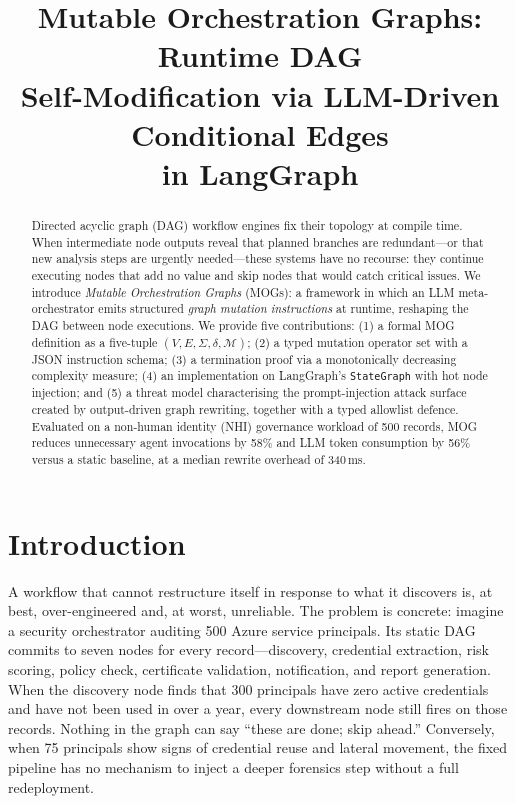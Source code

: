 \documentclass[conference]{IEEEtran}
\title{Mutable Orchestration Graphs: Runtime DAG\\
Self-Modification via LLM-Driven Conditional Edges\\
in LangGraph}
\author{
  \IEEEauthorblockN{Anonymous Author(s)}
  \IEEEauthorblockA{Submitted for blind review \\
  \texttt{anonymous@institution.edu}}
}
\begin{document}
\maketitle

\begin{abstract}
  Directed acyclic graph (DAG) workflow engines fix their topology
  at compile time. When intermediate node outputs reveal that planned
  branches are redundant---or that new analysis steps are urgently
  needed---these systems have no recourse: they continue executing
  nodes that add no value and skip nodes that would catch critical
  issues. We introduce \emph{Mutable Orchestration Graphs} (MOGs):
  a framework in which an LLM meta-orchestrator emits structured
  \emph{graph mutation instructions} at runtime, reshaping the DAG
  between node executions. We provide five contributions: (1) a
  formal MOG definition as a five-tuple $(V,E,\Sigma,\delta,\mathcal{M})$;
  (2) a typed mutation operator set with a JSON instruction schema;
  (3) a termination proof via a monotonically decreasing complexity
  measure; (4) an implementation on LangGraph's \texttt{StateGraph}
  with hot node injection; and (5) a threat model characterising
  the prompt-injection attack surface created by output-driven
  graph rewriting, together with a typed allowlist defence.
  Evaluated on a non-human identity (NHI) governance workload
  of 500 records, MOG reduces unnecessary agent invocations by
  58\% and LLM token consumption by 56\% versus a static baseline,
  at a median rewrite overhead of 340\,ms.
\end{abstract}

\section{Introduction}

A workflow that cannot restructure itself in response to what it
discovers is, at best, over-engineered and, at worst, unreliable.
The problem is concrete: imagine a security orchestrator auditing
500 Azure service principals. Its static DAG commits to seven nodes
for every record---discovery, credential extraction, risk scoring,
policy check, certificate validation, notification, and report
generation. When the discovery node finds that 300 principals have
zero active credentials and have not been used in over a year, every
downstream node still fires on those records. Nothing in the graph
can say ``these are done; skip ahead.'' Conversely, when 75 principals
show signs of credential reuse and lateral movement, the fixed pipeline
has no mechanism to inject a deeper forensics step without a full
redeployment.
\end{document}
